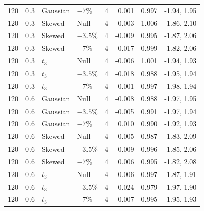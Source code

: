 \begin{longtable}{rrllrrrr}
120 & 0.3 & Gaussian & $-7\%$ & 4 & 0.001 & 0.997 & -1.94, 1.95 \\
120 & 0.3 & Skewed & Null & 4 & -0.003 & 1.006 & -1.86, 2.10 \\
120 & 0.3 & Skewed & $-3.5\%$ & 4 & -0.009 & 0.995 & -1.87, 2.06 \\
120 & 0.3 & Skewed & $-7\%$ & 4 & 0.017 & 0.999 & -1.82, 2.06 \\
120 & 0.3 & $t_3$ & Null & 4 & -0.006 & 1.001 & -1.94, 1.93 \\
120 & 0.3 & $t_3$ & $-3.5\%$ & 4 & -0.018 & 0.988 & -1.95, 1.94 \\
120 & 0.3 & $t_3$ & $-7\%$ & 4 & -0.001 & 0.997 & -1.98, 1.94 \\
120 & 0.6 & Gaussian & Null & 4 & -0.008 & 0.988 & -1.97, 1.95 \\
120 & 0.6 & Gaussian & $-3.5\%$ & 4 & -0.005 & 0.991 & -1.97, 1.94 \\
120 & 0.6 & Gaussian & $-7\%$ & 4 & 0.010 & 0.990 & -1.92, 1.93 \\
120 & 0.6 & Skewed & Null & 4 & -0.005 & 0.987 & -1.83, 2.09 \\
120 & 0.6 & Skewed & $-3.5\%$ & 4 & -0.009 & 0.996 & -1.85, 2.06 \\
120 & 0.6 & Skewed & $-7\%$ & 4 & 0.006 & 0.995 & -1.82, 2.08 \\
120 & 0.6 & $t_3$ & Null & 4 & -0.006 & 0.997 & -1.87, 1.91 \\
120 & 0.6 & $t_3$ & $-3.5\%$ & 4 & -0.024 & 0.979 & -1.97, 1.90 \\
120 & 0.6 & $t_3$ & $-7\%$ & 4 & 0.007 & 0.995 & -1.95, 1.93 \\
\end{longtable}

